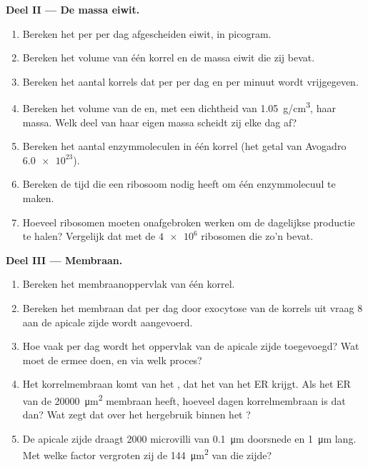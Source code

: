 \begin{problem}
\medskip
\noindent\textbf{Deel II --- De massa eiwit.}
\begin{enumerate}[resume]
  \item Bereken het per  per dag afgescheiden eiwit, in picogram.
  \item Bereken het volume van één korrel en de massa eiwit die zij bevat.
  \item Bereken het aantal korrels dat per  per dag en per minuut wordt
        vrijgegeven.
  \item Bereken het volume van de  en, met een dichtheid van
        \qty{1.05}{g/cm^3}, haar massa. Welk deel van haar eigen massa
        scheidt zij elke dag af?
  \item Bereken het aantal enzymmoleculen in één korrel (het getal van
        Avogadro $\num{6.0e23}$).
  \item Bereken de tijd die een ribosoom nodig heeft om één enzymmolecuul
        te maken.
  \item Hoeveel ribosomen moeten onafgebroken werken om de dagelijkse
        productie te halen? Vergelijk dat met de $\num{4e6}$ ribosomen die
        zo'n  bevat.
\end{enumerate}

\medskip
\noindent\textbf{Deel III --- Membraan.}
\begin{enumerate}[resume]
  \item Bereken het membraanoppervlak van één korrel.
  \item Bereken het membraan dat per dag door exocytose van de korrels uit
        vraag 8 aan de apicale zijde wordt aangevoerd.
  \item Hoe vaak per dag wordt het oppervlak van de apicale zijde
        toegevoegd? Wat moet de  ermee doen, en via welk proces?
  \item Het korrelmembraan komt van het , dat het van het ER
        krijgt. Als het ER van de  \qty{20000}{\micro m^2} membraan
        heeft, hoeveel dagen korrelmembraan is dat dan? Wat zegt dat over
        het hergebruik binnen het ?
  \item De apicale zijde draagt \qty{2000}{} microvilli van
        \qty{0.1}{\micro m} doorsnede en \qty{1}{\micro m} lang. Met welke
        factor vergroten zij de \qty{144}{\micro m^2} van die zijde?
\end{enumerate}


\end{problem}
